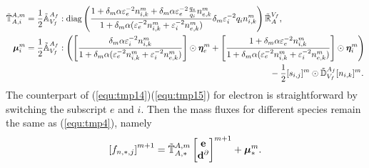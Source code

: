 \documentclass{report}
\begin{document}
\begin{align}
     \Tilde{\mathbb{T}}_{A, i}^{A, m} &= \frac{1}{2} \Tilde{\mathbb{A}}_{V_f}^{A_f} : \text{diag}\left(\frac{1 + \delta_m \alpha \varepsilon_e^{-2} n_{i,k}^m + \delta_m \alpha \varepsilon_e^{-2} \frac{q_e}{q_i}n_{e,k}^m }{1 + \delta_m \alpha (\varepsilon^{-2}_e n_{i,k}^m + \varepsilon_i^{-2} n_{e,k}^m)}\delta_m \varepsilon^{-2}_i q_i n^m_{i,k}\right) \Tilde{\mathbb{R}}^{V_f}_{A}, \label{equ:tmp14} \\
     \bm{\mu}^m_i &= \frac{1}{2}\Tilde{\mathbb{A}}_{V_f}^{A_f} :\left(\left[\frac{\delta_m \alpha \varepsilon_i^{-2} n_{i,k}^m}{1 + \delta_m \alpha (\varepsilon^{-2}_e n_{i,k}^m + \varepsilon^{-2}_i n_{e,k}^m)}\right] \odot \bm{\eta}_e^m + \left[\frac{1 + \delta_m \alpha \varepsilon^{-2}_e n_{i,k}^m}{1 + \delta_m \alpha (\varepsilon^{-2}_e n_{i,k}^m + \varepsilon^{-2}_i n_{e,k}^m)}\right] \odot \bm{\eta}_i^m \right) \nonumber \\
     &\hspace{10cm} - \frac{1}{2} [s_{i,j}]^m \odot \Tilde{\mathbb{D}}_{V_f}^{A_f} [n_{i,k}]^m. \label{equ:tmp15}
\end{align}
The counterpart of (\ref{equ:tmp14})(\ref{equ:tmp15}) for electron is straightforward by switching the subscript $e$ and $i$. Then the mass fluxes for different species remain the same as (\ref{equ:tmp4}), namely
\begin{equation}
    \left[f_{n,*,j}\right]^{m+1} = \Tilde{\mathbb{T}}_{A,*}^{A,m} 
    \begin{bmatrix}
    \mathbf{e} \\
    \mathbf{d}^\partial 
    \end{bmatrix}^{m+1} + \bm{\mu}^m_*.
\end{equation} 
\end{document}
